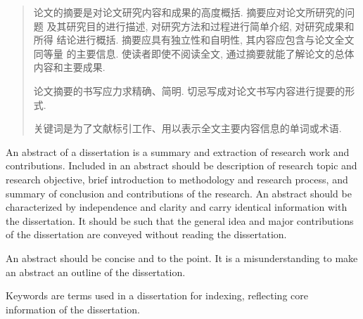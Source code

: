 

\begin{abstract}
论文的摘要是对论文研究内容和成果的高度概括. 摘要应对论文所研究的问题
及其研究目的进行描述, 对研究方法和过程进行简单介绍, 对研究成果和所得
结论进行概括. 摘要应具有独立性和自明性, 其内容应包含与论文全文同等量
的主要信息. 使读者即使不阅读全文, 通过摘要就能了解论文的总体内容和主要成果.

论文摘要的书写应力求精确、简明. 切忌写成对论文书写内容进行提要的形式.

关键词是为了文献标引工作、用以表示全文主要内容信息的单词或术语.

\end{abstract}

\begin{abstract*}
An abstract of a dissertation is a summary and extraction of research work and contributions.
Included in an abstract should be description of research topic and research objective, 
brief introduction to methodology and research process, and summary of conclusion and 
contributions of the research. An abstract should be characterized by independence and 
clarity and carry identical information with the dissertation. It should be such that the 
general idea and major contributions of the dissertation are conveyed without reading the dissertation.

An abstract should be concise and to the point. It is a misunderstanding to make an abstract 
an outline of the dissertation.

Keywords are terms used in a dissertation for indexing, reflecting core information of the dissertation.

\end{abstract*}